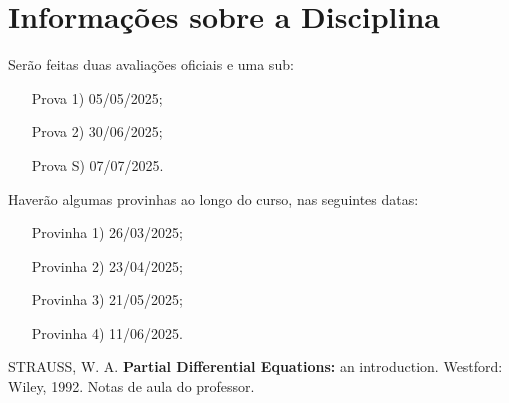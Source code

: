 \documentclass[12pt]{article}
\theoremstyle{definition}
\begin{document}
\section{Informações sobre a Disciplina}
Serão feitas duas avaliações oficiais e uma sub:
\begin{itemize}
	\item[Prova 1)] 05/05/2025;
	\item[Prova 2)] 30/06/2025;
	\item[Prova S)] 07/07/2025.
\end{itemize}
Haverão algumas provinhas ao longo do curso, nas seguintes datas:
\begin{itemize}
	\item[Provinha 1)] 26/03/2025;
	\item[Provinha 2)] 23/04/2025;
	\item[Provinha 3)] 21/05/2025;
	\item[Provinha 4)] 11/06/2025.
\end{itemize}


\newpage

\newpage

\newpage

\newpage

\newpage

\newpage

\newpage

\newpage

\newpage

\newpage

\newpage

\newpage

\newpage

\newpage

\newpage

\newpage

\newpage

\newpage

\newpage

\newpage

\begin{thebibliography}{99}
	 STRAUSS, W. A. \textbf{Partial Differential Equations:} an introduction. Westford: Wiley, 1992.
	 Notas de aula do professor.
\end{thebibliography}
\end{document}
